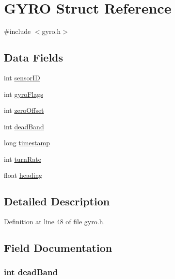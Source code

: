 \hypertarget{struct_g_y_r_o}{
\section{GYRO Struct Reference}
\label{struct_g_y_r_o}
}


{\ttfamily \#include $<$gyro.h$>$}

\subsection*{Data Fields}
\begin{DoxyCompactItemize}
\item 
int \hyperlink{struct_g_y_r_o_a4f5a5e2cb7ee061dd0bd29b7086d89ac}{sensorID}
\item 
int \hyperlink{struct_g_y_r_o_a1f856a6c5a2496da48674527809c15d3}{gyroFlags}
\item 
int \hyperlink{struct_g_y_r_o_a40304f830741a043ccf22db881cfe132}{zeroOffset}
\item 
int \hyperlink{struct_g_y_r_o_aacae3a4afdc78e2ab88ebf064a9fff3f}{deadBand}
\item 
long \hyperlink{struct_g_y_r_o_ac5deed89768140dbc80dbc6529a5e14a}{timestamp}
\item 
int \hyperlink{struct_g_y_r_o_a752eff326455596e842b018329b98ab3}{turnRate}
\item 
float \hyperlink{struct_g_y_r_o_ac5682e48513a771560df50e3b213e61a}{heading}
\end{DoxyCompactItemize}


\subsection{Detailed Description}


Definition at line 48 of file gyro.h.



\subsection{Field Documentation}
\hypertarget{struct_g_y_r_o_aacae3a4afdc78e2ab88ebf064a9fff3f}{
\subsubsection[{deadBand}]{\setlength{\rightskip}{0pt plus 5cm}int {\bf deadBand}}}
\label{struct_g_y_r_o_aacae3a4afdc78e2ab88ebf064a9fff3f}


